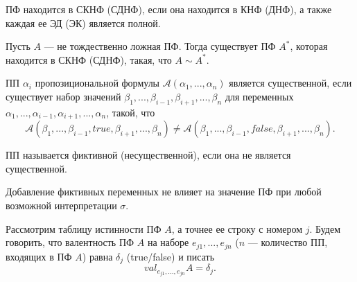 
    \begin{Def}
        ПФ находится в СКНФ (СДНФ), если она находится в КНФ (ДНФ), а также каждая ее ЭД (ЭК) является полной.
    \end{Def}

    \begin{Thm}
        Пусть $A$ --- не тождественно ложная ПФ. Тогда существует ПФ $A^*$, которая находится в СКНФ (СДНФ), такая, что $A \sim A^*$.
    \end{Thm}


    \begin{Def}
        ПП $\alpha_i$ пропозициональной формулы $\mathcal{A}(\alpha_1, ..., \alpha_n)$ является существенной, если существует набор значений $\beta_1, ..., \beta_{i-1}, \beta_{i+1}, ..., \beta_n$ для переменных $\alpha_1, ..., \alpha_{i-1}, \alpha_{i+1}, ..., \alpha_n$, такой, что 
        $$\mathcal{A}(\beta_1, ..., \beta_{i-1}, true, \beta_{i+1}, ..., \beta_n) \neq \mathcal{A}(\beta_1, ..., \beta_{i-1}, false, \beta_{i+1}, ..., \beta_n).$$

        ПП называется фиктивной (несущественной), если она не является существенной.
    \end{Def}

    \begin{Rem}
        Добавление фиктивных переменных не влияет на значение ПФ при любой возможной интерпретации $\sigma$.
    \end{Rem}


    
    \begin{Def}[Валентность ПФ]
        Рассмотрим таблицу истинности ПФ $A$, а точнее ее строку с номером $j$. Будем говорить, что валентность ПФ $A$ на наборе $e_{j1}, ..., e_{jn}$ ($n$ --- количество ПП, входящих в ПФ $A$) равна $\delta_j$ (true/false) и писать 
        $$val_{e_{j1}, ..., e_{jn}}A = \delta_j.$$
    \end{Def}

